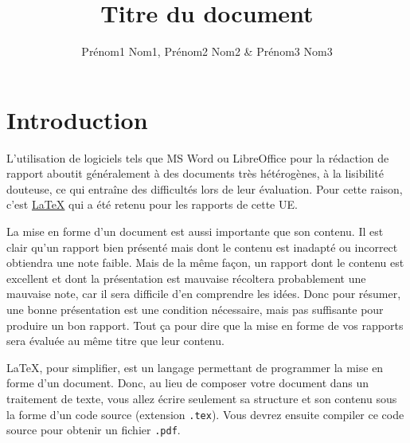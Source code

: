 \documentclass{ceri}
\title{Titre du document}
\author{
	Prénom1 Nom1, 
	Prénom2 Nom2 \&
	Prénom3 Nom3
}
\begin{document}
\maketitle

\MyToc

\sloppy          


\section{Introduction}
L'utilisation de logiciels tels que MS Word ou LibreOffice pour la rédaction de rapport aboutit généralement à des documents très hétérogènes, à la lisibilité douteuse, ce qui entraîne des difficultés lors de leur évaluation. Pour cette raison, c'est \href{http://fr.wikipedia.org/wiki/LaTeX}{\LaTeX} \cite{LaTeXProject2010, Wikipedia2011a} qui a été retenu pour les rapports de cette UE.

La mise en forme d'un document est aussi importante que son contenu. Il est clair qu'un rapport bien présenté mais dont le contenu est inadapté ou incorrect obtiendra une note faible. Mais de la même façon, un rapport dont le contenu est excellent et dont la présentation est mauvaise récoltera probablement une mauvaise note, car il sera difficile d'en comprendre les idées. Donc pour résumer, une bonne présentation est une condition nécessaire, mais pas suffisante pour produire un bon rapport. Tout ça pour dire que la mise en forme de vos rapports sera évaluée au même titre que leur contenu.
	
\LaTeX{}, pour simplifier, est un langage permettant de programmer la mise en forme d'un document. Donc, au lieu de composer votre document dans un traitement de texte, vous allez écrire seulement sa structure et son contenu sous la forme d'un code source (extension \texttt{.tex}). Vous devrez ensuite compiler ce code source pour obtenir un fichier \texttt{.pdf}.
	
\end{document}
